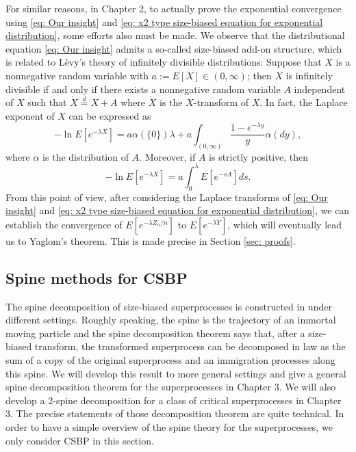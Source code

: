 \documentclass[UTF8]{pkuthss}
\theoremstyle{plain}
\theoremstyle{definition}
\numberwithin{equation}{section}
\begin{document}
For similar reasons, in Chapter 2,
to actually prove the exponential convergence using \eqref{eq: Our insight} and \eqref{eq: x2 type size-biased equation for exponential distribution}, some efforts also must be made.
We observe that the distributional equation \eqref{eq: Our insight} admits
a so-called size-biased add-on structure, which is related to L\`evy's
theory of infinitely divisible distributions: Suppose that $X$ is a nonnegative random variable with
$ a := E [X]\in (0,\infty)$; then
$X$ is infinitely divisible if and only if there exists a nonnegative random variable $A$ independent of $X$ such that $\dot X 	\overset{d} = X + A$ where $\dot X$ is the $X$-transform of $X$.
In fact,
the Laplace exponent of $X$ can be expressed as
\[
-\ln E[ e^{-\lambda X}]
=  a \alpha(\{0\}) \lambda+ a \int_{(0,\infty)} \frac{1 - e^{-\lambda y}}{y} \alpha(dy),
\]
where $\alpha$ is the distribution of $A$.
Moreover, if $A$ is strictly positive, then
\[
-\ln E[ e^{-\lambda X}]
=  a  \int_0^\lambda E [e^{-s A}] ds.
\]
From this point of view, after considering the Laplace transforms of
\eqref{eq: Our insight} and \eqref{eq: x2 type size-biased equation for exponential distribution}, we can establish the convergence of $E[e^{-\lambda \dot Z_n/n}]$ to $E[e^{-\lambda \dot {Y}}]$, which will eventually lead us to Yaglom's theorem.
This is made precise in Section \ref{sec: proofs}. 

\subsection{Spine methods for CSBP}

The spine decomposition of size-biased superprocesses is constructed in \cite{EckhoffKyprianouWinkel2015Spines, EnglanderKyprianou2004Local, LiuRenSong2009LlogL} under different settings. Roughly speaking, the spine is the trajectory of an immortal moving particle and the spine decomposition theorem says that, after a size-biased transform, the transformed superprocess can be decomposed in law as the sum of a copy of the original superprocess and an immigration processes along this spine. 
We will develop this result to more general settings and give a general spine decomposition theorem for the superprocesses in Chapter 3. 
We will also develop a 2-spine decomposition for a class of critical superprocesses in Chapter 3. 
The precise statements of those decomposition theorem are quite technical. In order to have a simple overview of the spine theory for the superprocesses, we only consider CSBP in this section.
	
\end{document}
